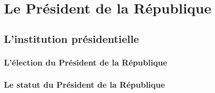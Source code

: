 \documentclass[12pt, a4paper, openany]{book}
\begin{document}
\chapter{Le Président de la République}

\section{L'institution présidentielle}

\subsection{L'élection du Président de la République}

\subsection{Le statut du Président de la République}
\end{document}
